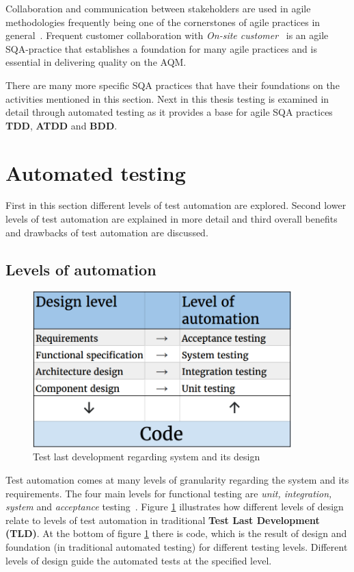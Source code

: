     Collaboration and communication between stakeholders are used in agile methodologies frequently being one of the
    cornerstones of agile practices in general~\cite{huo2004software}. Frequent customer collaboration with \textit{On-site customer}~\cite{huo2004software}
    is an agile SQA-practice that establishes a foundation for many agile practices and is essential in delivering
    quality on the AQM.

    There are many more specific SQA practices that have their foundations on the activities mentioned in this section.
    Next in this thesis testing is examined in detail through automated testing as it provides a base for agile SQA practices \textbf{TDD},
    \textbf{ATDD} and \textbf{BDD}.

\section{Automated testing}
    First in this section different levels of test automation are explored. Second lower levels of test automation are explained in more
    detail and third overall benefits and drawbacks of test automation are discussed.

    \subsection{Levels of automation}
    \begin{figure}[ht]
      \begin{center}
        \includegraphics[width=10cm]{images/testlevels.png}
        \caption{Test last development regarding system and its design}
        \label{fig:testlevels}
      \end{center}
    \end{figure}

    Test automation comes at many levels of granularity regarding the system and its requirements. The four main levels for
    functional testing are \textit{unit, integration, system} and \textit{acceptance} testing~\cite{itkonen2016}.
    Figure \ref{fig:testlevels} illustrates how different levels of design relate to levels of test automation in traditional
    \textbf{Test Last Development (TLD)}. At the bottom
    of figure \ref{fig:testlevels} there is code, which is the result of design and foundation (in traditional automated testing)
    for different testing levels. Different levels of design guide the automated tests at the specified level.

